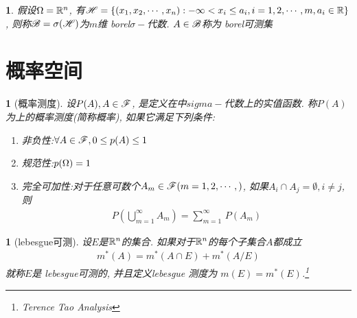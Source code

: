 \newtheorem{borel_sigma_algebra}[theorem_root]{}
\begin{borel_sigma_algebra}
假设\(\mO = \Rs^n\), 有\(\msH = \{(x_1, x_2,\cdots,x_n):-\infty<x_i\le a_i, i = 1, 2, \cdots, m, a_i\in\Rs\}\),
则称\(\msB = \sigma(\msH)\)为$m$维 borel$\sigma-$代数.
$A\in \msB$称为 borel可测集
\end{borel_sigma_algebra}

\section{概率空间}

\newtheorem{probability_measure}[theorem_root]{}
\begin{probability_measure}[概率测度]
    \label{def:probability-measure}
    设\(P(A), A\in\msF\), 是定义在\mO 中$sigma-$代数\msF 上的实值函数.
    称$P(A)$为\msF 上的概率测度(简称概率), 如果它满足下列条件:
    \begin{enumerate}
        \item 非负性:\quad \(\forall A\in\msF, 0\le p(A)\le 1\)
        \item 规范性:\quad \(p(\mO) = 1\)
        \item 完全可加性:\quad 对于任意可数个\(A_m\in\msF (m=1,2,\cdots,)\), 
        如果\(A_i\cap A_j = \emptyset, i\ne j\), 则
        \begin{align}
            P\left(\bigcup\limits_{m=1}^\infty A_m\right) = \sum\limits_{m=1}^\infty\,P(A_m)
        \end{align}
    \end{enumerate}
\end{probability_measure}

\newtheorem*{lebesgue_measurable}{\remark}
\begin{lebesgue_measurable}[lebesgue可测]
设\(E\)是\(\Rs^n\)的集合. 如果对于\(\Rs^n\)的每个子集合\(A\)都成立
\begin{align*}
m^\ast(A) = m^\ast(A\cap E) +  m^\ast(A/ E)
\end{align*}
就称\(E\)是 lebesgue可测的, 并且定义lebesgue 测度为 \(m(E)= m^\ast(E)\).\footnote{Terence Tao Analysis}
\end{lebesgue_measurable}

